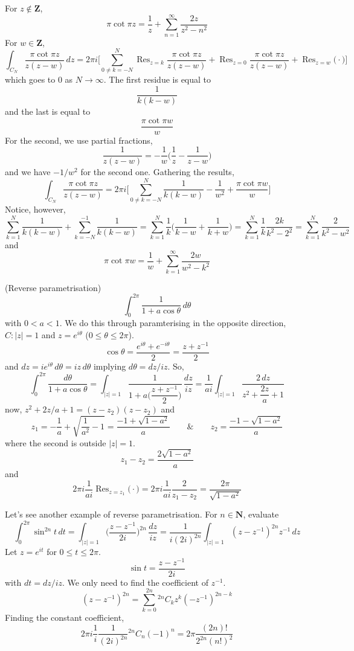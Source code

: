 \vspace{2ex}
\begin{thm}
For $z\notin {\bm Z}$, 
\[\pi \cot \pi z=\dfrac{1}{z}+\sum ^{\infty }_{n=1}\dfrac{2z}{z^2-n^2}\]
For $w\in {\bm Z}$,
\[\int _{C_{N}}\dfrac{\pi \cot \pi z}{z(z-w)}\,dz=2\pi i\Big[\sum _{0\ne k=-N}^{N}\mathop{\mathrm{Res}}_{z=k}\dfrac{\pi \cot \pi z}{z(z-w)}+\mathop{\mathrm{Res}}_{z=0}\dfrac{\pi \cot \pi z}{z(z-w)}+\mathop{\mathrm{Res}}_{z=w}\Big(\cdot \Big)\Big]\]
which goes to 0 as $N\rightarrow \infty $. The first residue is equal to
\[\dfrac{1}{k(k-w)}\]
and the last is equal to 
\[\dfrac{\pi \cot \pi w}{w}\]
For the second, we use partial fractions,
\[\dfrac{1}{z(z-w)}=-\dfrac{1}{w}\Big(\dfrac{1}{z}-\dfrac{1}{z-w}\Big)\]
and we have $-1/w^2$ for the second one. Gathering the results,
\[\int _{C_{N}}\dfrac{\pi \cot \pi z}{z(z-w)}=2\pi i\Big[\sum _{0\ne k=-N}^{N}\dfrac{1}{k(k-w)}-\dfrac{1}{w^2}+\dfrac{\pi \cot \pi w}{w}\Big]\]
Notice, however,
\[\sum _{k=1}^{N}\dfrac{1}{k(k-w)}+\sum ^{-1}_{k=-N}\dfrac{1}{k(k-w)}=\sum ^{N}_{k=1}\dfrac{1}{k}\Big(\dfrac{1}{k-w}+\dfrac{1}{k+w}\Big)=\sum ^{N}_{k=1}\dfrac{1}{k}\dfrac{2k}{k^2-2^2}=\sum ^{N}_{k=1}\dfrac{2}{k^2-w^2}\]
and
\[\pi \cot \pi w=\dfrac{1}{w}+\sum ^{\infty }_{k=1}\dfrac{2w}{w^2-k^2}\]
\end{thm}
\vspace{2ex}
\begin{ex}
(Reverse parametrisation) \[\int ^{2\pi }_{0}\dfrac{1}{1+a\cos \theta }\,d\theta \]
with $0<a<1$. We do this through paramterising in the opposite direction, $C:|z|=1$ and $z=e^{i\theta }$ ($0\leq \theta \leq 2\pi $).
\[\cos \theta =\dfrac{e^{i\theta }+e^{-i\theta }}{2}=\dfrac{z+z^{-1}}{2}\]
and $dz=ie^{i\theta }\,d\theta =iz\,d\theta $ implying $d\theta =dz/iz$. So,
\[\int ^{2\pi }_{0}\dfrac{d\theta }{1+a\cos \theta }=\int _{|z|=1}\dfrac{1}{1+a\Big(\dfrac{z+z^{-1}}{2}\Big)}\,\dfrac{dz}{iz}=\dfrac{1}{ai}\int _{|z|=1}\dfrac{2\,dz}{z^2+\dfrac{2z}{a}+1}\]
now, $z^2+2z/a+1=(z-z_2)(z-z_2)$ and
\[z_1=-\dfrac{1}{a}+\sqrt{\dfrac{1}{a^2}-1}=\dfrac{-1+\sqrt{1-a^2}}{a}\qquad\&\qquad z_2=\dfrac{-1-\sqrt{1-a^2}}{a}\]
where the second is outside $|z|=1$. 
\[z_1-z_2=\dfrac{2\sqrt{1-a^2}}{a}\]
and
\[2\pi i\dfrac{1}{ai}\mathop{\mathrm{Res}}_{z=z_1}\Big(\cdot \Big)=2\pi i\dfrac{1}{ai}\dfrac{2}{z_1-z_2}=\dfrac{2\pi }{\sqrt{1-a^2}}\]
\end{ex}
\vspace{2ex}
\begin{ex}
Let's see another example of reverse parametrisation. For $n\in {\bm N}$, evaluate
\[\int ^{2\pi }_{0}\sin ^{2n}t\,dt=\int _{|z|=1}\Big(\dfrac{z-z^{-1}}{2i}\Big)^{2n}\,\dfrac{dz}{iz}=\dfrac{1}{i(2i)^{2n}}\int _{|z|=1}(z-z^{-1})^{2n}z^{-1}\,dz\]
Let $z=e^{it}$ for $0\leq t\leq 2\pi $. 
\[\sin t=\dfrac{z-z^{-1}}{2i}\]
with $dt=dz/iz$. We only need to find the coefficient of $z^{-1}$. 
\[(z-z^{-1})^{2n}=\sum ^{2n}_{k=0}{}^{2n}C_{k}z^{k}(-z^{-1})^{2n-k}
\]
Finding the constant coefficient, 
\[2\pi i\dfrac{1}{i}\dfrac{1}{(2i)^{2n}}{}^{2n}C_{n}(-1)^{n}=2\pi \dfrac{(2n)!}{2^{2n}(n!)^2}\]
\end{ex}
\vspace{2ex}

